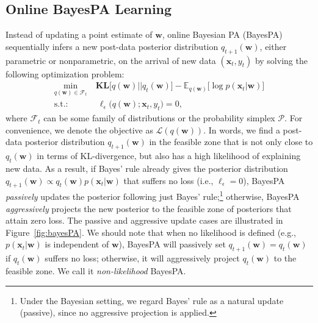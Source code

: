 \documentclass[twoside,11pt]{article}
\newcommand{\xv}{\bm{x}}
\newcommand{\wv}{\bm{w}}
\newcommand{\prob}{\mathcal{P}}
\newcommand{\KL}{\textbf{KL}}
\begin{document}
\subsection{Online BayesPA Learning}
Instead of updating a point estimate of $\bm{w}$, online Bayesian PA (BayesPA) sequentially infers a new post-data posterior distribution $q_{t+1}(\bm{w})$, either parametric or nonparametric, on the arrival of new data $(\xv_t, y_t)$ by solving the following optimization problem:
\setlength\arraycolsep{1pt} \begin{equation}\label{eq:onlinepa}
\begin{array}{rl}
\underset{q(\bm{w}) \in \mathcal{F}_t}{\operatorname{min}} & ~\KL\Big[q(\bm{w}) || q_{t}(\bm{w}) \Big]-\mathbb{E}_{q(\bm{w})}\Big[\log p(\bm{x}_t | \bm{w})\Big] \\
\text{s.t.:} &~~ \ell_\epsilon\Big(q(\bm{w}); \bm{x}_t, y_t\Big) = 0,
\end{array}
\end{equation}
where $\mathcal{F}_t$ can be some family of distributions or the probability simplex $\prob$. For convenience, we denote the objective as $\mathcal{L}(q(\wv))$. In words, we find a post-data posterior distribution $q_{t+1}(\bm{w})$ in the feasible zone that is not only close to $q_t(\bm{w})$ in terms of KL-divergence, but also has a high likelihood of explaining new data. %
As a result, if Bayes' rule already gives the posterior distribution $q_{t+1}(\bm{w}) \propto q_{t}(\bm{w}) p(\bm{x}_t | \bm{w})$ that suffers no loss (i.e., $\ell_\epsilon = 0$), BayesPA \emph{passively} updates the posterior following just Bayes' rule;\footnote{Under the Bayesian setting, we regard Bayes' rule as a natural update (passive), since no aggressive projection is applied.} otherwise, BayesPA \emph{aggressively} projects the new posterior to the feasible zone of posteriors that attain zero loss. The passive and aggressive update cases are illustrated in Figure~\ref{fig:bayesPA}. We should note that when no likelihood is defined (e.g., $p(\xv_t|\wv)$ is independent of $\wv$), BayesPA will passively set $q_{t+1}(\wv) = q_t(\wv)$ if $q_t(\wv)$ suffers no loss; otherwise, it will aggressively project $q_t(\wv)$ to the feasible zone. We call it {\it non-likelihood} BayesPA.
\end{document}
